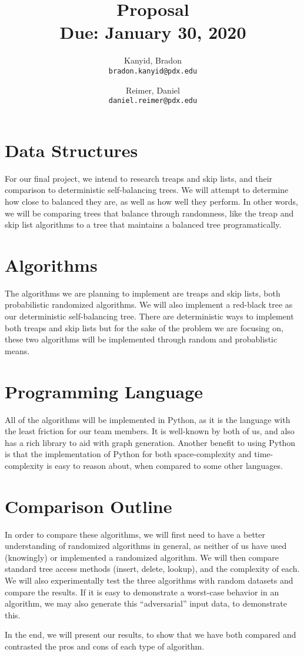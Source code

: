 \documentclass[11pt]{article}
\title{\bf Proposal \\[2ex]
\rm\normalsize Due: January 30, 2020}
\date{}
\author{
  Kanyid, Bradon\\
  \texttt{bradon.kanyid@pdx.edu}
  \and
  Reimer, Daniel\\
  \texttt{daniel.reimer@pdx.edu}
}
\begin{document}
\maketitle

\section{Data Structures}
For our final project, we intend to research treaps and skip lists, and their comparison to deterministic self-balancing trees. We will attempt to determine how close to balanced they are, as well as how well they perform. In other words, we will be comparing trees that balance through randomness, like the treap and skip list algorithms to a tree that maintains a balanced tree programatically.

\section{Algorithms}
The algorithms we are planning to implement are treaps and skip lists, both probabilistic randomized algorithms. We will also implement a red-black tree as our deterministic self-balancing tree. There are deterministic ways to implement both treaps and skip lists but for the sake of the problem we are focusing on, these two algorithms will be implemented through random and probablistic means.

\section{Programming Language}
All of the algorithms will be implemented in Python, as it is the language with the least friction for our team members. It is well-known by both of us, and also has a rich library to aid with graph generation. Another benefit to using Python is that the implementation of Python for both space-complexity and time-complexity is easy to reason about, when compared to some other languages.

\section{Comparison Outline}
In order to compare these algorithms, we will first need to have a better understanding of randomized algorithms in general, as neither of us have used (knowingly) or implemented a randomized algorithm. We will then compare standard tree access methods (insert, delete, lookup), and the complexity of each. We will also experimentally test the three algorithms with random datasets and compare the results. If it is easy to demonstrate a worst-case behavior in an algorithm, we may also generate this ``adversarial'' input data, to demonstrate this.

In the end, we will present our results, to show that we have both compared and contrasted the pros and cons of each type of algorithm.
\end{document}
